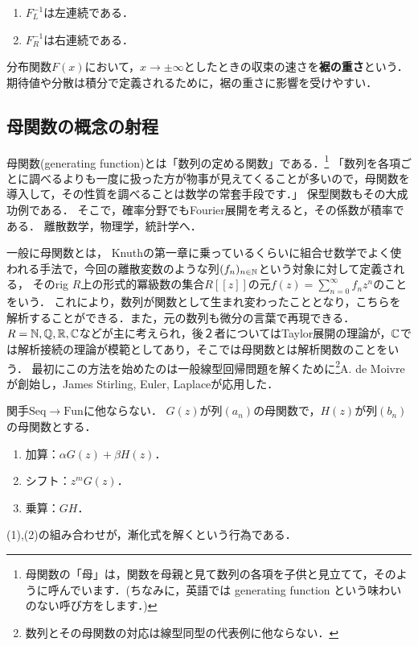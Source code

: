 \documentclass[uplatex,dvipdfmx]{jsreport}
\begin{document}
\begin{lemma}\mbox{}
    \begin{enumerate}
        \item $F^{-1}_L$は左連続である．
        \item $F^{-1}_R$は右連続である．
    \end{enumerate}
\end{lemma}

\begin{definition}
    分布関数$F(x)$において，$x\to\pm\infty$としたときの収束の速さを\textbf{裾の重さ}という．
    期待値や分散は積分で定義されるために，裾の重さに影響を受けやすい．
\end{definition}

\subsection{母関数の概念の射程}

\begin{tcolorbox}[colframe=ForestGreen, colback=ForestGreen!10!white,breakable,colbacktitle=ForestGreen!40!white,coltitle=black,fonttitle=\bfseries\sffamily,
title=]
    母関数(generating function)とは「数列の定める関数」である．\footnote{母関数の「母」は，関数を母親と見て数列の各項を子供と見立てて，そのように呼んでいます．(ちなみに，英語では generating function という味わいのない呼び方をします．)}
    「数列を各項ごとに調べるよりも一度に扱った方が物事が見えてくることが多いので，母関数を導入して，その性質を調べることは数学の常套手段です．」
    保型関数もその大成功例である．
    そこで，確率分野でもFourier展開を考えると，その係数が積率である．
    離散数学，物理学，統計学へ．
\end{tcolorbox}

\begin{remark}
    一般に母関数とは，
    Knuthの第一章に乗っているくらいに組合せ数学でよく使われる手法で，今回の離散変数のような列$(f_n)_{n\in\mathbb{N}}$という対象に対して定義される，
    そのrig $R$上の形式的冪級数の集合$R[[z]]$の元$f(z)=\sum_{n=0}^\infty f_nz^n$のことをいう．
    これにより，数列が関数として生まれ変わったこととなり，こちらを解析することができる．また，元の数列も微分の言葉で再現できる．
    $R=\mathbb{N},\mathbb{Q},\mathbb{R},\mathbb{C}$などが主に考えられ，後２者についてはTaylor展開の理論が，$\mathbb{C}$では解析接続の理論が模範としてあり，そこでは母関数とは解析関数のことをいう．
    最初にこの方法を始めたのは一般線型回帰問題を解くために\footnote{数列とその母関数の対応は線型同型の代表例に他ならない．}A. de Moivreが創始し，James Stirling, Euler, Laplaceが応用した．
\end{remark}
\begin{example}[母関数の応用]
    関手$\mathrm{Seq}\to\mathrm{Fun}$に他ならない．
    $G(z)$が列$(a_n)$の母関数で，$H(z)$が列$(b_n)$の母関数とする．
    \begin{enumerate}
        \item 加算：$\alpha G(z)+\beta H(z)$．
        \item シフト：$z^mG(z)$．
        \item 乗算：$GH$．
    \end{enumerate}
    (1),(2)の組み合わせが，漸化式を解くという行為である．
\end{example}
\end{document}
